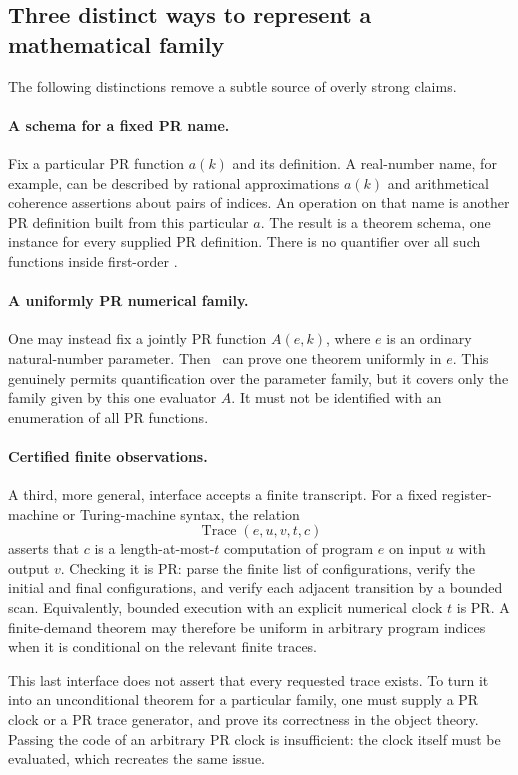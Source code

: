 \subsection{Three distinct ways to represent a mathematical family}
\label{sec:three-representations}

The following distinctions remove a subtle source of overly strong claims.

\paragraph{A schema for a fixed PR name.}
Fix a particular PR function $a(k)$ and its definition.  A real-number name,
for example, can be described by rational approximations $a(k)$ and
arithmetical coherence assertions about pairs of indices.  An operation on
that name is another PR definition built from this particular $a$.  The
result is a theorem schema, one instance for every supplied PR definition.
There is no quantifier over all such functions inside first-order \ipra.

\paragraph{A uniformly PR numerical family.}
One may instead fix a jointly PR function $A(e,k)$, where $e$ is an ordinary
natural-number parameter.  Then \ipra\ can prove one theorem uniformly in
$e$.  This genuinely permits quantification over the parameter family, but
it covers only the family given by this one evaluator $A$.  It must not be
identified with an enumeration of all PR functions.

\paragraph{Certified finite observations.}
A third, more general, interface accepts a finite transcript.  For a fixed
register-machine or Turing-machine syntax, the relation
\[
 \operatorname{Trace}(e,u,v,t,c)
\]
asserts that $c$ is a length-at-most-$t$ computation of program $e$ on input
$u$ with output $v$.  Checking it is PR: parse the finite list of
configurations, verify the initial and final configurations, and verify each
adjacent transition by a bounded scan.  Equivalently, bounded execution with
an explicit numerical clock $t$ is PR.  A finite-demand theorem may
therefore be uniform in arbitrary program indices when it is conditional on
the relevant finite traces.

This last interface does not assert that every requested trace exists.  To
turn it into an unconditional theorem for a particular family, one must
supply a PR clock or a PR trace generator, and prove its correctness in the
object theory.  Passing the code of an arbitrary PR clock is insufficient:
the clock itself must be evaluated, which recreates the same issue.

